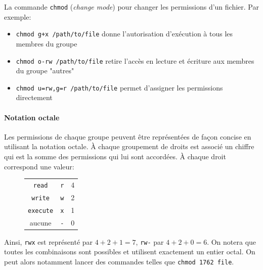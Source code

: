 \documentclass[french, toc]{../cs-classes/cs-classes}
\begin{document}
La commande \texttt{chmod} (\emph{change mode}) pour changer les permissions d'un fichier. Par exemple:
\begin{itemize}
    \item \texttt{chmod g+x /path/to/file} donne l'autorisation d'exécution à tous les membres du groupe
    \item \texttt{chmod o-rw /path/to/file} retire l'accès en lecture et écriture aux membres du groupe "autres"
    \item \texttt{chmod u=rw,g=r /path/to/file} permet d'assigner les permissions directement
\end{itemize}

\paragraph*{Notation octale}
Les permissions de chaque groupe peuvent être représentées de façon concise en utilisant la notation octale. À chaque groupement de droits est associé un chiffre qui est la somme des permissions qui lui sont accordées. À chaque droit correspond une valeur:
\begin{figure}[!ht]
    \centering
    \begin{tabular}{c c c}
        \texttt{read} & \texttt{r} & 4 \\
        \texttt{write} & \texttt{w} & 2 \\
        \texttt{execute} & \texttt{x} & 1 \\
        aucune & \texttt{-} & 0 \\
    \end{tabular}
\end{figure}

Ainsi, \texttt{rwx} est représenté par $4+2+1=7$, \texttt{rw-} par $4+2+0=6$. On notera que toutes les combinaisons sont possibles et utilisent exactement un entier octal. On peut alors notamment lancer des commandes telles que \texttt{chmod 1762 file}.
\end{document}
